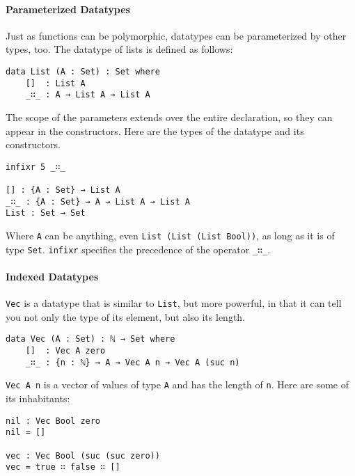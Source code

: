 \documentclass[../thesis.tex]{subfiles}
\begin{document}
\paragraph{Parameterized Datatypes}

Just as functions can be polymorphic, datatypes can be parameterized by other
types, too. The datatype of lists is defined as follows:

\begin{lstlisting}
data List (A : Set) : Set where
    []  : List A
    _∷_ : A → List A → List A
\end{lstlisting}

The scope of the parameters extends over the entire declaration, so they can
appear in the constructors.
Here are the types of the datatype and its constructors.

\begin{lstlisting}
infixr 5 _∷_

[] : {A : Set} → List A
_∷_ : {A : Set} → A → List A → List A
List : Set → Set
\end{lstlisting}

Where {\lstinline|A|} can be anything, even {\lstinline|List (List (List Bool))|},
as long as it is of type {\lstinline|Set|}. {\lstinline|infixr|} specifies the
precedence of the operator {\lstinline|_∷_|}.

\paragraph{Indexed Datatypes}


{\lstinline|Vec|} is a datatype that is similar to {\lstinline|List|}, but more
powerful, in that it can tell you not only the type of its element, but also its
length.

\begin{lstlisting}
data Vec (A : Set) : ℕ → Set where
    []  : Vec A zero
    _∷_ : {n : ℕ} → A → Vec A n → Vec A (suc n)
\end{lstlisting}

{\lstinline|Vec A n|} is a vector of values of type {\lstinline|A|} and
has the length of {\lstinline|n|}. Here are some of its inhabitants:

\begin{lstlisting}
nil : Vec Bool zero
nil = []

vec : Vec Bool (suc (suc zero))
vec = true ∷ false ∷ []
\end{lstlisting}
\end{document}
